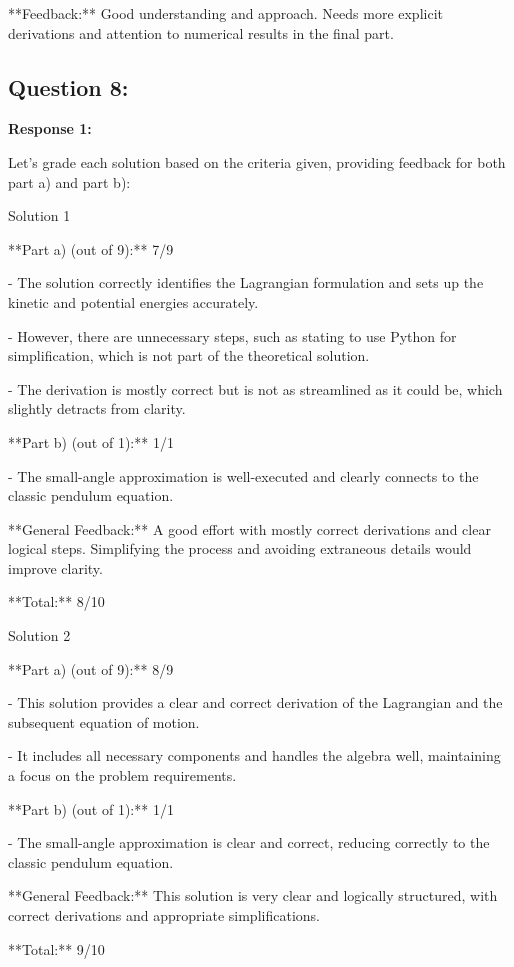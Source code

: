 \documentclass[a4paper,11pt]{article}
\begin{document}
**Feedback:** Good understanding and approach. Needs more explicit derivations and attention to numerical results in the final part.



\subsection*{Question 8:}

\textbf{Response 1:}

Let's grade each solution based on the criteria given, providing feedback for both part a) and part b):

Solution 1

**Part a) (out of 9):** 7/9

- The solution correctly identifies the Lagrangian formulation and sets up the kinetic and potential energies accurately.

- However, there are unnecessary steps, such as stating to use Python for simplification, which is not part of the theoretical solution.

- The derivation is mostly correct but is not as streamlined as it could be, which slightly detracts from clarity.

**Part b) (out of 1):** 1/1

- The small-angle approximation is well-executed and clearly connects to the classic pendulum equation.

**General Feedback:** A good effort with mostly correct derivations and clear logical steps. Simplifying the process and avoiding extraneous details would improve clarity.

**Total:** 8/10

Solution 2

**Part a) (out of 9):** 8/9

- This solution provides a clear and correct derivation of the Lagrangian and the subsequent equation of motion.

- It includes all necessary components and handles the algebra well, maintaining a focus on the problem requirements.

**Part b) (out of 1):** 1/1

- The small-angle approximation is clear and correct, reducing correctly to the classic pendulum equation.

**General Feedback:** This solution is very clear and logically structured, with correct derivations and appropriate simplifications.

**Total:** 9/10
\end{document}
